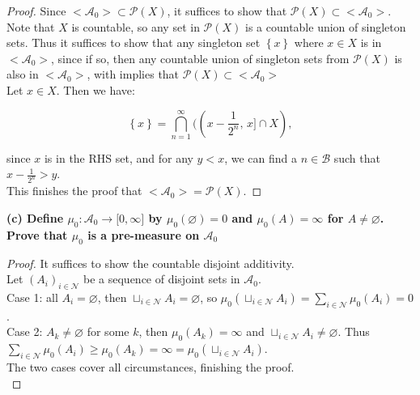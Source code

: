 \begin{proof}

Since \(< \mathcal{A}_{0} > \subset \mathcal{P}(X)\), it suffices to show that \(\mathcal{P}(X) \subset < \mathcal{A}_{0} >\). Note that \(X\) is countable, so any set in \(\mathcal{P}(X)\) is a countable union of singleton sets. Thus it suffices to show that any singleton set \(\left\{ x \right\}\) where \(x \in X\) is in \(< \mathcal{A}_{0} >\), since if so, then any countable union of singleton sets from \(\mathcal{P}(X)\) is also in \(< \mathcal{A}_{0} >\), with implies that \(\mathcal{P}(X) \subset < \mathcal{A}_{0} >\)\\
Let \(x \in X\). Then we have:

\[\left\{ x \right\} = \bigcap\limits_{n = 1}^{\infty}((x - \frac{1}{2^{n}},\, x\rbrack \cap X),\]

since \(x\) is in the RHS set, and for any \(y < x\), we can find a \(n \in \mathcal{B}\) such that \(x - \frac{1}{2^{n}} > y\).\\
This finishes the proof that \(< \mathcal{A}_{0} > = \mathcal{P}(X)\).

\end{proof}

\textbf{(c) Define \(\mu_{0}:\mathcal{A}_{0}\rightarrow\lbrack 0,\infty\rbrack\) by \(\mu_{0}(\varnothing) = 0\) and \(\mu_{0}(A) = \infty\) for \(A \neq \varnothing\). Prove that \(\mu_{0}\) is a pre-measure on \(\mathcal{A}_{0}\)}

\begin{proof}

It suffices to show the countable disjoint additivity.\\
Let \((A_{i})_{i \in \mathcal{N}}\) be a sequence of disjoint sets in \(\mathcal{A}_{0}\).\\
Case 1: all \(A_{i} = \varnothing\), then \(\sqcup_{i \in \mathcal{N}}A_{i} = \varnothing\), so \(\mu_{0}( \sqcup_{i \in \mathcal{N}}A_{i}) = \sum_{i \in \mathcal{N}}\mu_{0}(A_{i}) = 0\).\\
Case 2: \(A_{k} \neq \varnothing\) for some \(k\), then \(\mu_{0}(A_{k}) = \infty\) and \(\sqcup_{i \in \mathcal{N}}A_{i} \neq \varnothing\). Thus \(\sum_{i \in \mathcal{N}}\mu_{0}(A_{i}) \geq \mu_{0}(A_{k}) = \infty = \mu_{0}( \sqcup_{i \in \mathcal{N}}A_{i})\).\\
The two cases cover all circumstances, finishing the proof.\\

\end{proof}

